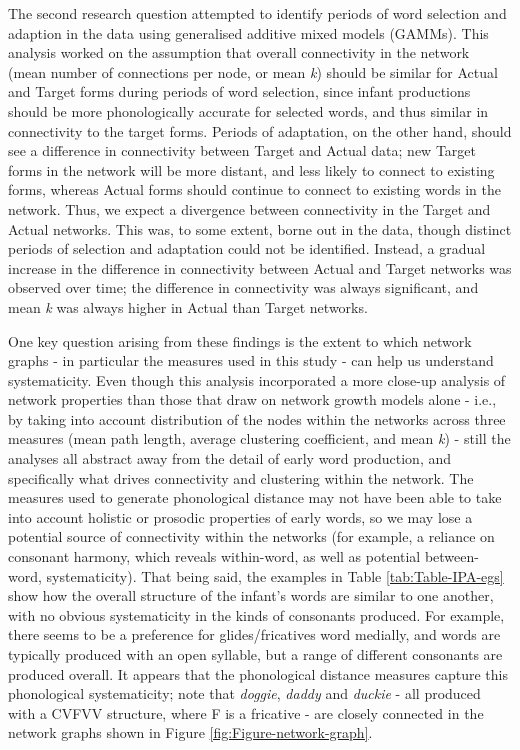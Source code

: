 \documentclass[
  man]{apa6}
\begin{document}
The second research question attempted to identify periods of word selection and adaption in the data using generalised additive mixed models (GAMMs). This analysis worked on the assumption that overall connectivity in the network (mean number of connections per node, or mean \emph{k}) should be similar for Actual and Target forms during periods of word selection, since infant productions should be more phonologically accurate for selected words, and thus similar in connectivity to the target forms. Periods of adaptation, on the other hand, should see a difference in connectivity between Target and Actual data; new Target forms in the network will be more distant, and less likely to connect to existing forms, whereas Actual forms should continue to connect to existing words in the network. Thus, we expect a divergence between connectivity in the Target and Actual networks. This was, to some extent, borne out in the data, though distinct periods of selection and adaptation could not be identified. Instead, a gradual increase in the difference in connectivity between Actual and Target networks was observed over time; the difference in connectivity was always significant, and mean \emph{k} was always higher in Actual than Target networks.

One key question arising from these findings is the extent to which network graphs - in particular the measures used in this study - can help us understand systematicity. Even though this analysis incorporated a more close-up analysis of network properties than those that draw on network growth models alone - i.e., by taking into account distribution of the nodes within the networks across three measures (mean path length, average clustering coefficient, and mean \emph{k}) - still the analyses all abstract away from the detail of early word production, and specifically what drives connectivity and clustering within the network. The measures used to generate phonological distance may not have been able to take into account holistic or prosodic properties of early words, so we may lose a potential source of connectivity within the networks (for example, a reliance on consonant harmony, which reveals within-word, as well as potential between-word, systematicity). That being said, the examples in Table \ref{tab:Table-IPA-egs} show how the overall structure of the infant's words are similar to one another, with no obvious systematicity in the kinds of consonants produced. For example, there seems to be a preference for glides/fricatives word medially, and words are typically produced with an open syllable, but a range of different consonants are produced overall. It appears that the phonological distance measures capture this phonological systematicity; note that \emph{doggie}, \emph{daddy} and \emph{duckie} - all produced with a CVFVV structure, where F is a fricative - are closely connected in the network graphs shown in Figure \ref{fig:Figure-network-graph}.
\end{document}
